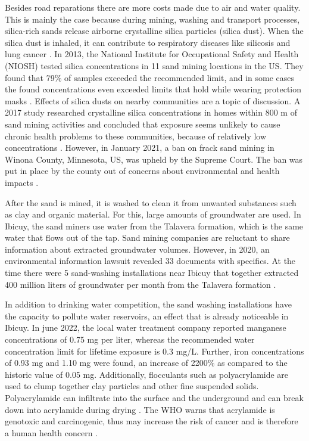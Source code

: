 Besides road reparations there are more costs made due to air and water quality.
This is mainly the case because during mining, washing and transport processes, silica-rich sands release airborne crystalline silica particles (silica dust). When the silica dust is inhaled, it can contribute to respiratory diseases like silicosis and lung cancer \autocite{physiciansforsocialresponsibilityCompendiumScientificMedical2023}. In 2013, the National Institute for Occupational Safety and Health (NIOSH) tested silica concentrations in 11 sand mining locations in the US. They found that 79\% of samples exceeded the recommended limit, and in some cases the found concentrations even exceeded limits that hold while wearing protection masks \autocite{fogliaSedArena2023}. Effects of silica dusts on nearby communities are a topic of discussion. A 2017 study researched crystalline silica concentrations in homes within 800 m of sand mining activities and concluded that exposure seems unlikely to cause chronic health problems to these communities, because of relatively low concentrations \autocite{petersCommunityAirborneParticulate2017}. However, in January 2021, a ban on frack sand mining in Winona County, Minnesota, US, was upheld by the Supreme Court. The ban was put in place by the county out of concerns about environmental and health impacts \autocite{physiciansforsocialresponsibilityCompendiumScientificMedical2023}.

After the sand is mined, it is washed to clean it from unwanted substances such as clay and organic material. For this, large amounts of groundwater are used. In Ibicuy, the sand miners use water from the Talavera formation, which is the same water that flows out of the tap. Sand mining companies are reluctant to share information about extracted groundwater volumes. However, in 2020, an environmental information lawsuit revealed 33 documents with specifics. At the time there were 5 sand-washing installations near Ibicuy that together extracted 400 million liters of groundwater per month from the Talavera formation \autocite{fogliaSedArena2023}.

In addition to drinking water competition, the sand washing installations have the capacity to pollute water reservoirs, an effect that is already noticeable in Ibicuy. In june 2022, the local water treatment company reported manganese concentrations of 0.75 mg per liter, whereas the recommended water concentration limit for lifetime exposure is 0.3 mg/L. Further, iron concentrations of 0.93 mg and 1.10 mg were found, an increase of 2200\% as compared to the historic value of 0.05 mg. Additionally, flocculants such as polyacrylamide are used to clump together clay particles and other fine suspended solids. Polyacrylamide can infiltrate into the surface and the underground and can break down into acrylamide during drying \autocite{fogliaSedArena2023}. The WHO warns that acrylamide is genotoxic and carcinogenic, thus may increase the risk of cancer and is therefore a human health concern \autocite{worldhealthorganizationAcrylamide2011}.